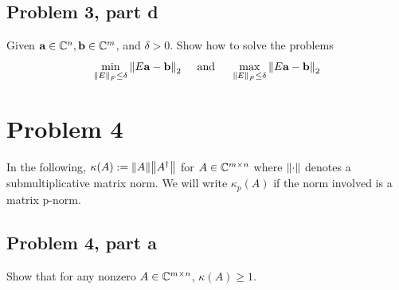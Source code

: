 \newpage
\subsection{Problem 3, part d}
Given $\textbf{a} \in \mathbb{C}^n, \textbf{b} \in \mathbb{C}^m$, and $\delta > 0$. Show how to solve the problems 
\[
\min_{\norm{E}_F \leq \delta} \norm{E\textbf{a} - \textbf{b}}_2 \hspace{5mm} \text{and} \hspace{5mm} \max_{\norm{E}_F \leq \delta} \norm{E\textbf{a} - \textbf{b}}_2
\]
\partbreak
\begin{solution}
    
\end{solution}
\newpage
\section{Problem 4}
In the following, $\kappa(A) := \norm{A}\norm{A^\dag}$ for $A\in \mathbb{C}^{m\times n}$ where $\norm{\cdot}$ denotes a submultiplicative matrix norm. We will write $\kappa_p(A)$ if the norm involved is a matrix p-norm. 

\subsection{Problem 4, part a}
Show that for any nonzero $A \in \mathbb{C}^{m\times n}$, $\kappa(A) \geq 1$.

